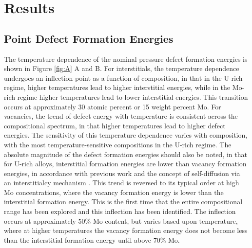 \documentclass[default]{sn-jnl}%
\begin{document}
\section{Results}\label{sec3}
\subsection{Point Defect Formation Energies}
The temperature dependence of the nominal pressure defect formation energies is shown in Figure \ref{fig:A} A and B. For interstitials, the temperature dependence undergoes an inflection point as a function of composition, in that in the U-rich regime, higher temperatures lead to higher interstitial energies, while in the Mo-rich regime higher temperatures lead to lower interstitial energies. This transition occurs at approximately 30 atomic percent or 15 weight percent Mo. For vacancies, the trend of defect energy with temperature is consistent across the compositional spectrum, in that higher temperatures lead to higher defect energies. The sensitivity of this temperature dependence varies with composition, with the most temperature-sensitive compositions in the U-rich regime. The absolute magnitude of the defect formation energies should also be noted, in that for U-rich alloys, interstitial formation energies are lower than vacancy formation energies, in accordance with previous work \cite{beeler2010,beelerAIMD,smirnova2015} and the concept of self-diffusion via an interstitialcy mechanism \cite{park2021}. This trend is reversed to its typical order at high Mo concentrations, where the vacancy formation energy is lower than the interstitial formation energy. This is the first time that the entire compositional range has been explored and this inflection has been identified. The inflection occurs at approximately 50\% Mo content, but varies based upon temperature, where at higher temperatures the vacancy formation energy does not become less than the interstitial formation energy until above 70\% Mo. 
\end{document}
